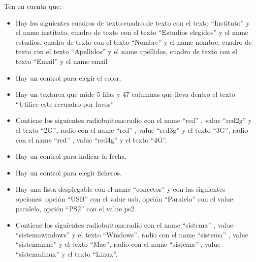 \documentclass[a4paper, 12pt]{examen}
\begin{document}
Ten en cuenta que:

\begin{itemize}





    \item{Hay los siguientes cuadros de texto:cuadro de texto con el texto ``Instituto'' y el name instituto, cuadro de texto con el texto ``Estudios elegidos'' y el name estudios, cuadro de texto con el texto ``Nombre'' y el name nombre, cuadro de texto con el texto ``Apellidos'' y el name apellidos, cuadro de texto con el texto ``Email'' y el name email}

    \item{Hay un control para elegir el color.}

    \item{Hay un textarea que mide 5 filas y 47 columnas que lleva dentro el texto ``Utilice este recuadro por favor''}

    \item{Contiene los siguientes radiobuttons:radio con el name ``red'' , value ``red2g'' y el texto ``2G'', radio con el name ``red'' , value ``red3g'' y el texto ``3G'', radio con el name ``red'' , value ``red4g'' y el texto ``4G''.}

    \item{Hay un control para indicar la fecha.}

    \item{Hay un control para elegir ficheros.}

    \item{Hay una lista desplegable con el name ``conector'' y con las siguientes opciones: opción ``USB'' con el value usb, opción ``Paralelo'' con el value paralelo, opción ``PS2'' con el value ps2.}

    \item{Contiene los siguientes radiobuttons:radio con el name ``sistema'' , value ``sistemawindows'' y el texto ``Windows'', radio con el name ``sistema'' , value ``sistemamac'' y el texto ``Mac'', radio con el name ``sistema'' , value ``sistemalinux'' y el texto ``Linux''.}


\end{itemize}
\end{document}
